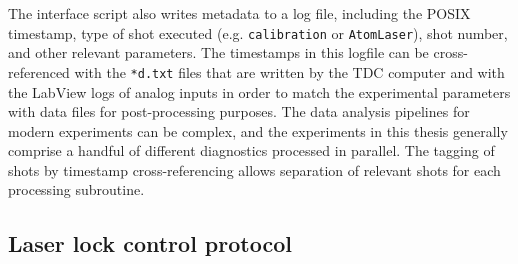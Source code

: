 	The interface script also writes metadata to a log file, including the POSIX timestamp, type of shot executed (e.g.
	\verb|calibration| or \verb|AtomLaser|), shot number, and other relevant parameters.
	The timestamps in this logfile can be cross-referenced with the \verb|*d.txt| files that are written by the TDC computer and with the LabView logs of analog inputs in order to match the experimental parameters with data files for post-processing purposes.
	The data analysis pipelines for modern experiments can be complex, and the experiments in this thesis generally comprise a handful of different diagnostics processed in parallel.
	The tagging of shots by timestamp cross-referencing allows separation of relevant shots for each processing subroutine.
	
\subsection{Laser lock control protocol}


